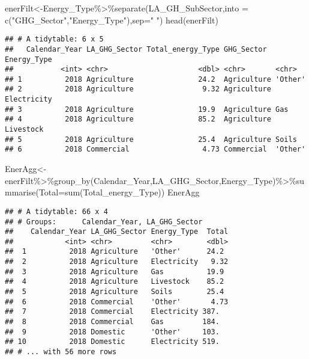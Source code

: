 \documentclass[
]{article}
\newenvironment{Shaded}{\begin{snugshade}}{\end{snugshade}}
\newcommand{\AttributeTok}[1]{\textcolor[rgb]{0.77,0.63,0.00}{#1}}
\newcommand{\FunctionTok}[1]{\textcolor[rgb]{0.00,0.00,0.00}{#1}}
\newcommand{\NormalTok}[1]{#1}
\newcommand{\OtherTok}[1]{\textcolor[rgb]{0.56,0.35,0.01}{#1}}
\newcommand{\SpecialCharTok}[1]{\textcolor[rgb]{0.00,0.00,0.00}{#1}}
\newcommand{\StringTok}[1]{\textcolor[rgb]{0.31,0.60,0.02}{#1}}
\begin{document}
\begin{Shaded}
\begin{Highlighting}[]
\NormalTok{enerFilt}\OtherTok{\textless{}{-}}\NormalTok{Energy\_Type}\SpecialCharTok{\%\textgreater{}\%}\FunctionTok{separate}\NormalTok{(LA\_GH\_SubSector,}\AttributeTok{into =} \FunctionTok{c}\NormalTok{(}\StringTok{"GHG\_Sector"}\NormalTok{,}\StringTok{"Energy\_Type"}\NormalTok{),}\AttributeTok{sep=}\StringTok{" "}\NormalTok{)}
\FunctionTok{head}\NormalTok{(enerFilt)}
\end{Highlighting}
\end{Shaded}

\begin{verbatim}
## # A tidytable: 6 x 5
##   Calendar_Year LA_GHG_Sector Total_energy_Type GHG_Sector  Energy_Type
##           <int> <chr>                     <dbl> <chr>       <chr>      
## 1          2018 Agriculture               24.2  Agriculture 'Other'    
## 2          2018 Agriculture                9.32 Agriculture Electricity
## 3          2018 Agriculture               19.9  Agriculture Gas        
## 4          2018 Agriculture               85.2  Agriculture Livestock  
## 5          2018 Agriculture               25.4  Agriculture Soils      
## 6          2018 Commercial                 4.73 Commercial  'Other'
\end{verbatim}

\begin{Shaded}
\begin{Highlighting}[]
\NormalTok{EnerAgg}\OtherTok{\textless{}{-}}\NormalTok{enerFilt}\SpecialCharTok{\%\textgreater{}\%}\FunctionTok{group\_by}\NormalTok{(Calendar\_Year,LA\_GHG\_Sector,Energy\_Type)}\SpecialCharTok{\%\textgreater{}\%}\FunctionTok{summarise}\NormalTok{(}\AttributeTok{Total=}\FunctionTok{sum}\NormalTok{(Total\_energy\_Type))}
\NormalTok{EnerAgg}
\end{Highlighting}
\end{Shaded}

\begin{verbatim}
## # A tidytable: 66 x 4
## # Groups:      Calendar_Year, LA_GHG_Sector
##    Calendar_Year LA_GHG_Sector Energy_Type  Total
##            <int> <chr>         <chr>        <dbl>
##  1          2018 Agriculture   'Other'      24.2 
##  2          2018 Agriculture   Electricity   9.32
##  3          2018 Agriculture   Gas          19.9 
##  4          2018 Agriculture   Livestock    85.2 
##  5          2018 Agriculture   Soils        25.4 
##  6          2018 Commercial    'Other'       4.73
##  7          2018 Commercial    Electricity 387.  
##  8          2018 Commercial    Gas         184.  
##  9          2018 Domestic      'Other'     103.  
## 10          2018 Domestic      Electricity 519.  
## # ... with 56 more rows
\end{verbatim}
\end{document}
